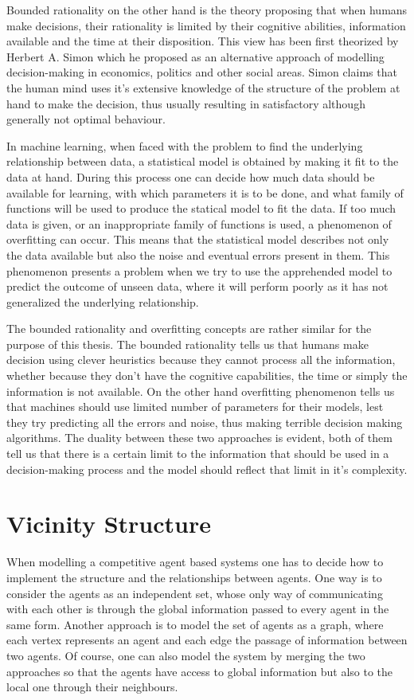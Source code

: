 Bounded rationality on the other hand is the theory proposing that when humans make decisions, their rationality is limited by their cognitive abilities, information available and the time at their disposition.
This view has been first theorized by Herbert A. Simon which he proposed as an alternative approach of modelling decision-making in economics, politics and other social areas. 
Simon claims that the human mind uses it's extensive knowledge of the structure of the problem at hand to make the decision, thus usually resulting in satisfactory although generally not optimal behaviour.

In machine learning, when faced with the problem to find the underlying relationship between data, a statistical model is obtained by making it fit to the data at hand.
During this process one can decide how much data should be available for learning, with which parameters it is to be done, and what family of functions will be used to produce the statical model to fit the data.
If too much data is given, or an inappropriate family of functions is used, a phenomenon of overfitting can occur.
This means that the statistical model describes not only the data available but also the noise and eventual errors present in them.
This phenomenon presents a problem when we try to use the apprehended model to predict the outcome of unseen data, where it will perform poorly as it has not generalized the underlying relationship.

The bounded rationality and overfitting concepts are rather similar for the purpose of this thesis.
The bounded rationality tells us that humans make decision using clever heuristics because they cannot process all the information, whether because they don't have the cognitive capabilities, the time or simply the information is not available.
On the other hand overfitting phenomenon tells us that machines should use limited number of parameters for their models, lest they try predicting all the errors and noise, thus making terrible decision making algorithms.
The duality between these two approaches is evident, both of them tell us that there is a certain limit to the information that should be used in a decision-making process and the model should reflect that limit in it's complexity.

\section{Vicinity Structure}
\label{1:vicinity}

When modelling a competitive agent based systems one has to decide how to implement the structure and the relationships between agents.
One way is to consider the agents as an independent set, whose only way of communicating with each other is through the global information passed to every agent in the same form.
Another approach is to model the set of agents as a graph, where each vertex represents an agent and each edge the passage of information between two agents.
Of course, one can also model the system by merging the two approaches so that the agents have access to global information but also to the local one through their neighbours.

